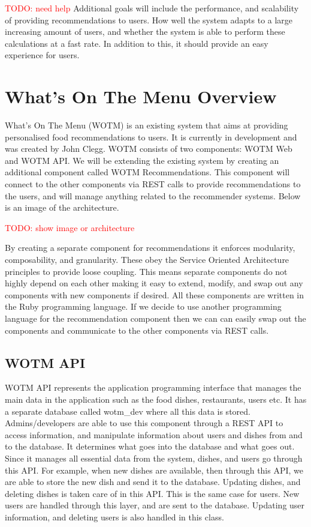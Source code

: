 \textcolor{red}{TODO: need help}
Additional goals will include the performance, and scalability of providing recommendations to users. How well the system adapts to a large increasing amount of users, and whether the system is able to perform these calculations at a fast rate. In addition to this, it should provide an easy experience for users.

\section{What's On The Menu Overview}

What's On The Menu (WOTM) is an existing system that aims at providing personalised food recommendations to users. It is currently in development and was created by John Clegg. WOTM consists of two components: WOTM Web and WOTM API. We will be extending the existing system by creating an additional component called WOTM Recommendations. This component will connect to the other components via REST calls to provide recommendations to the users, and will manage anything related to the recommender systems. Below is an image of the architecture. 

\textcolor{red}{TODO: show image or architecture}

By creating a separate component for recommendations it enforces modularity, composability, and granularity. These obey the Service Oriented Architecture principles to provide loose coupling. This means separate components do not highly depend on each other making it easy to extend, modify, and swap out any components with new components if desired. All these components are written in the Ruby programming language. If we decide to use another programming language for the recommendation component then we can can easily swap out the components and communicate to the other components via REST calls. 


\subsection{WOTM API}

WOTM API represents the application programming interface that manages the main data in the application such as the food dishes, restaurants, users etc. It has a separate database called wotm\_dev where all this data is stored. Admins/developers are able to use this component through a REST API to access information, and manipulate information about users and dishes from and to the database. It determines what goes into the database and what goes out. Since it manages all essential data from the system, dishes, and users go through this API. For example, when new dishes are available, then through this API, we are able to store the new dish and send it to the database. Updating dishes, and deleting dishes is taken care of in this API. This is the same case for users. New users are handled through this layer, and are sent to the database. Updating user information, and deleting users is also handled in this class.

